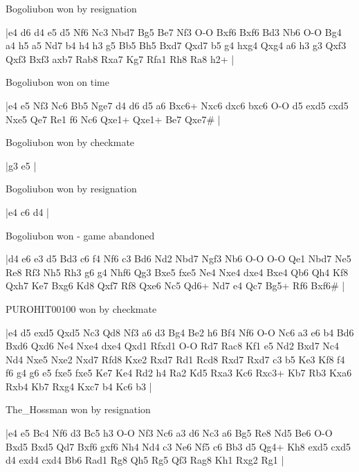 Bogoliubon won by resignation

\makegametitle
|e4 d6 d4 e5 d5 Nf6 Nc3 Nbd7 Bg5 Be7 Nf3 O-O Bxf6 Bxf6 Bd3 Nb6 O-O Bg4 a4 h5 a5 Nd7 b4 h4 h3 g5 Bb5 Bh5 Bxd7 Qxd7 b5 g4 hxg4 Qxg4 a6 h3 g3 Qxf3 Qxf3 Bxf3 axb7 Rab8 Rxa7 Kg7 Rfa1 Rh8 Ra8 h2+  |

\showboard

Bogoliubon won on time

\makegametitle
|e4 e5 Nf3 Nc6 Bb5 Nge7 d4 d6 d5 a6 Bxc6+ Nxc6 dxc6 bxc6 O-O d5 exd5 cxd5 Nxe5 Qe7 Re1 f6 Nc6 Qxe1+ Qxe1+ Be7 Qxe7\#  |

\showboard

Bogoliubon won by checkmate

\makegametitle
|g3 e5  |

\showboard

Bogoliubon won by resignation

\makegametitle
|e4 c6 d4  |

\showboard

Bogoliubon won - game abandoned

\makegametitle
|d4 e6 e3 d5 Bd3 c6 f4 Nf6 c3 Bd6 Nd2 Nbd7 Ngf3 Nb6 O-O O-O Qe1 Nbd7 Ne5 Re8 Rf3 Nh5 Rh3 g6 g4 Nhf6 Qg3 Bxe5 fxe5 Ne4 Nxe4 dxe4 Bxe4 Qb6 Qh4 Kf8 Qxh7 Ke7 Bxg6 Kd8 Qxf7 Rf8 Qxe6 Nc5 Qd6+ Nd7 e4 Qc7 Bg5+ Rf6 Bxf6\#  |

\showboard

PUROHIT00100 won by checkmate

\makegametitle
|e4 d5 exd5 Qxd5 Nc3 Qd8 Nf3 a6 d3 Bg4 Be2 h6 Bf4 Nf6 O-O Nc6 a3 e6 b4 Bd6 Bxd6 Qxd6 Ne4 Nxe4 dxe4 Qxd1 Rfxd1 O-O Rd7 Rac8 Kf1 e5 Nd2 Bxd7 Nc4 Nd4 Nxe5 Nxe2 Nxd7 Rfd8 Kxe2 Rxd7 Rd1 Rcd8 Rxd7 Rxd7 c3 b5 Ke3 Kf8 f4 f6 g4 g6 e5 fxe5 fxe5 Ke7 Ke4 Rd2 h4 Ra2 Kd5 Rxa3 Kc6 Rxc3+ Kb7 Rb3 Kxa6 Rxb4 Kb7 Rxg4 Kxc7 b4 Kc6 b3  |

\showboard

The\_Hossman won by resignation

\makegametitle
|e4 e5 Bc4 Nf6 d3 Bc5 h3 O-O Nf3 Nc6 a3 d6 Nc3 a6 Bg5 Re8 Nd5 Be6 O-O Bxd5 Bxd5 Qd7 Bxf6 gxf6 Nh4 Nd4 c3 Ne6 Nf5 c6 Bb3 d5 Qg4+ Kh8 exd5 cxd5 d4 exd4 cxd4 Bb6 Rad1 Rg8 Qh5 Rg5 Qf3 Rag8 Kh1 Rxg2 Rg1  |


